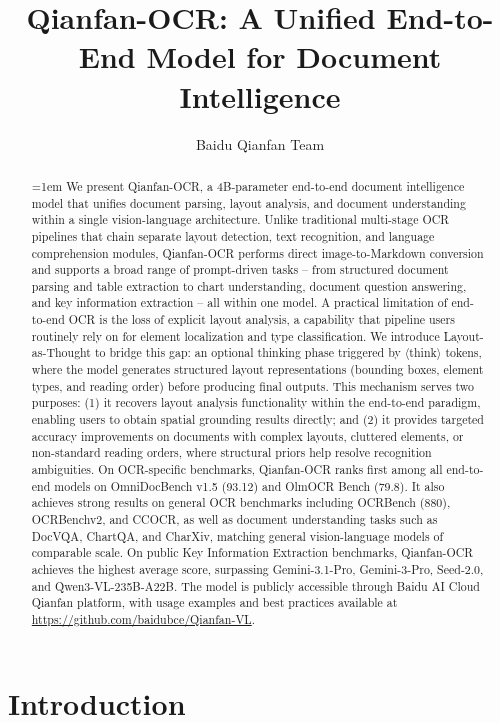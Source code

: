 \documentclass[dvipsnames]{article}
\title{Qianfan-OCR: A Unified End-to-End Model for Document Intelligence}
\author{
Baidu Qianfan Team
}
\begin{document}
\maketitle

\begin{abstract}
\emergencystretch=1em
  We present Qianfan-OCR, a 4B-parameter end-to-end document intelligence model that unifies document parsing, layout analysis, and document understanding within a single vision-language architecture. Unlike traditional multi-stage OCR pipelines that chain separate layout detection, text recognition, and language comprehension modules, Qianfan-OCR performs direct image-to-Markdown conversion and supports a broad range of prompt-driven tasks -- from structured document parsing and table extraction to chart understanding, document question answering, and key information extraction -- all within one model.
  A practical limitation of end-to-end OCR is the loss of explicit layout analysis, a capability that pipeline users routinely rely on for element localization and type classification. We introduce Layout-as-Thought to bridge this gap: an optional thinking phase triggered by $\langle$think$\rangle$ tokens, where the model generates structured layout representations (bounding boxes, element types, and reading order) before producing final outputs. This mechanism serves two purposes: (1) it recovers layout analysis functionality within the end-to-end paradigm, enabling users to obtain spatial grounding results directly; and (2) it provides targeted accuracy improvements on documents with complex layouts, cluttered elements, or non-standard reading orders, where structural priors help resolve recognition ambiguities.
  On OCR-specific benchmarks, Qianfan-OCR ranks first among all end-to-end models on OmniDocBench v1.5 (93.12) and OlmOCR Bench (79.8). It also achieves strong results on general OCR benchmarks including OCRBench (880), OCRBenchv2, and CCOCR, as well as document understanding tasks such as DocVQA, ChartQA, and CharXiv, matching general vision-language models of comparable scale. On public Key Information Extraction benchmarks, Qianfan-OCR achieves the highest average score, surpassing Gemini-3.1-Pro, Gemini-3-Pro, Seed-2.0, and Qwen3-VL-235B-A22B. The model is publicly accessible through Baidu AI Cloud Qianfan platform, with usage examples and best practices available at \url{https://github.com/baidubce/Qianfan-VL}.
\end{abstract}

\section{Introduction}
\end{document}
